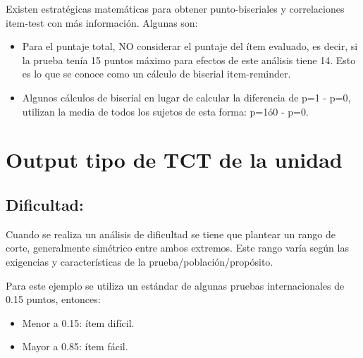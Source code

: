 \documentclass[
  letterpaper,
  DIV=11,
  numbers=noendperiod]{scrreprt}
\begin{document}
Existen estratégicas matemáticas para obtener punto-biseriales y
correlaciones item-test con más información. Algunas son:

\begin{itemize}
\item
  Para el puntaje total, NO considerar el puntaje del ítem evaluado, es
  decir, si la prueba tenía 15 puntos máximo para efectos de este
  análisis tiene 14. Esto es lo que se conoce como un cálculo de
  biserial item-reminder.
\item
  Algunos cálculos de biserial en lugar de calcular la diferencia de p=1
  - p=0, utilizan la media de todos los sujetos de esta forma: p=1ó0 -
  p=0.
\end{itemize}

\section{Output tipo de TCT de la
unidad}\label{output-tipo-de-tct-de-la-unidad}

\subsection{\texorpdfstring{\textbf{Dificultad:}}{Dificultad:}}\label{dificultad-1}

\begin{tcolorbox}[enhanced jigsaw, opacityback=0, bottomrule=.15mm, rightrule=.15mm, leftrule=.75mm, coltitle=black, colbacktitle=quarto-callout-tip-color!10!white, left=2mm, title=\textcolor{quarto-callout-tip-color}{\faLightbulb}\hspace{0.5em}{Tip}, bottomtitle=1mm, toprule=.15mm, colframe=quarto-callout-tip-color-frame, breakable, titlerule=0mm, toptitle=1mm, arc=.35mm, colback=white, opacitybacktitle=0.6]

Cuando se realiza un análisis de dificultad se tiene que plantear un
rango de corte, generalmente simétrico entre ambos extremos. Este rango
varía según las exigencias y características de la
prueba/población/propósito.

Para este ejemplo se utiliza un estándar de algunas pruebas
internacionales de 0.15 puntos, entonces:

\begin{itemize}
\item
  Menor a 0.15: ítem difícil.
\item
  Mayor a 0.85: ítem fácil.
\end{itemize}

\end{tcolorbox}
\end{document}
